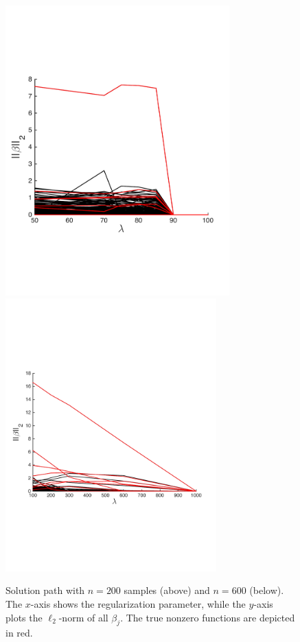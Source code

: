 \begin{figure}
\centering
\includegraphics[width=3.4in]{figs/solnpath200.pdf}
\includegraphics[width=3.2in]{figs/solnpath600.pdf}
\vspace{\imcaptionspace}
\caption[]{\small Solution path with $n=200$ samples (above) and
$n=600$ (below). The $x$-axis shows the regularization parameter,
while the $y$-axis plots the $\ell_2$-norm of all $\beta_j$. The true nonzero functions are depicted in red.}
\vspace{\imtextspace}
\label{fig:n200}
\end{figure}

